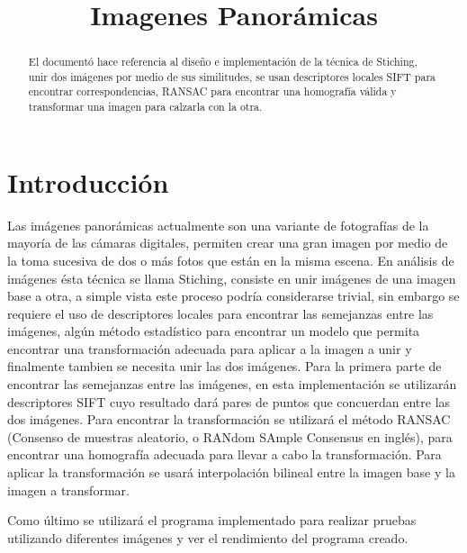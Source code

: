 \documentclass[conference]{IEEEtran}
\begin{document}
\title{Imagenes Panorámicas}
\author{
}


\maketitle

\begin{abstract}
	El documentó hace referencia al diseño e implementación de la técnica de Stiching, unir dos imágenes por medio de sus similitudes, se usan descriptores locales SIFT para encontrar correspondencias, RANSAC para encontrar una homografía válida y transformar una imagen para calzarla con la otra.
\end{abstract}
 

\section*{Introducción} %
	Las imágenes panorámicas actualmente son una variante de fotografías de la mayoría de las cámaras digitales, permiten crear una gran imagen por medio de la toma sucesiva de dos o más fotos que están en la misma escena.
	En análisis de imágenes ésta técnica se llama Stiching, consiste en unir imágenes de una imagen base a otra, a simple vista este proceso podría considerarse trivial, sin embargo se requiere el uso de descriptores locales para encontrar las semejanzas entre las imágenes, algún método estadístico para encontrar un modelo que permita encontrar una transformación adecuada para aplicar a la imagen a unir y finalmente tambien se necesita unir las dos imágenes.
	Para la primera parte de encontrar las semejanzas entre las imágenes, en esta implementación se utilizarán descriptores SIFT cuyo resultado dará pares de puntos que concuerdan entre las dos imágenes.
	Para encontrar la transformación se utilizará el método RANSAC (Consenso de muestras aleatorio, o RANdom SAmple Consensus en inglés), para encontrar una homografía adecuada para llevar a cabo la transformación.
	Para aplicar la transformación se usará interpolación bilineal entre la imagen base y la imagen a transformar.
	
	Como último se utilizará el programa implementado para realizar pruebas utilizando diferentes imágenes y ver el rendimiento del programa creado.
	
\end{document}
